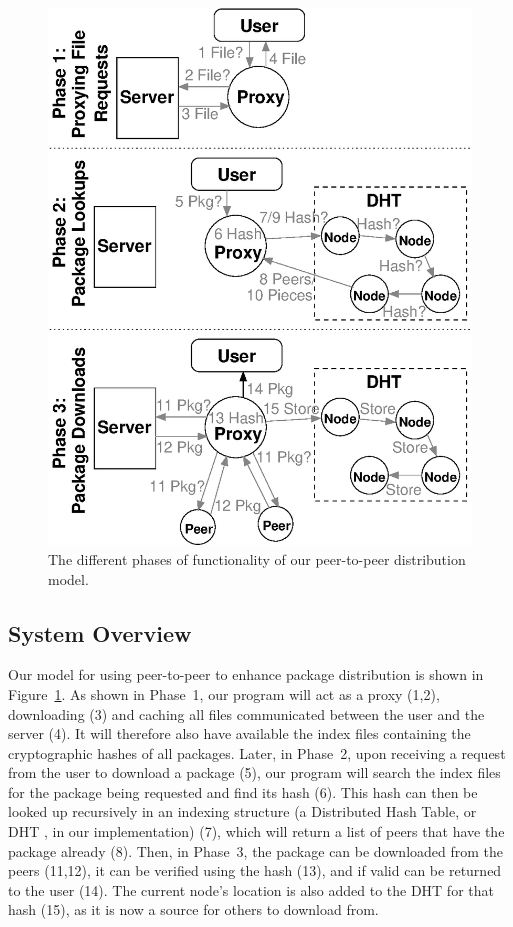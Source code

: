 \documentclass[conference]{IEEEtran}
\begin{document}
\begin{figure}
\centering
\includegraphics[width=0.9\columnwidth]{model_simple.eps}
\caption{The different phases of functionality of our peer-to-peer distribution model.}
\label{model}
\end{figure}

\subsection{System Overview}
Our model for using peer-to-peer to enhance package distribution is shown in
Figure~\ref{model}. As shown in Phase~1, our program will act as a
proxy (1,2), downloading (3) and caching all files communicated
between the user and the server (4). It will therefore also have
available the index files containing the cryptographic hashes of all
packages. Later, in Phase~2, upon receiving a request from the user
to download a package (5), our program will search the index files
for the package being requested and find its hash (6). This hash can
then be looked up recursively in an indexing structure (a Distributed Hash Table, or DHT \cite{kademlia}, in our implementation) (7), which will return a
list of peers that have the package already (8). Then, in Phase~3, the package
can be downloaded from the peers (11,12), it can be verified using
the hash (13), and if valid can be returned to the user (14). The
current node's location is also added to the DHT for that hash (15),
as it is now a source for others to download from.
\end{document}
